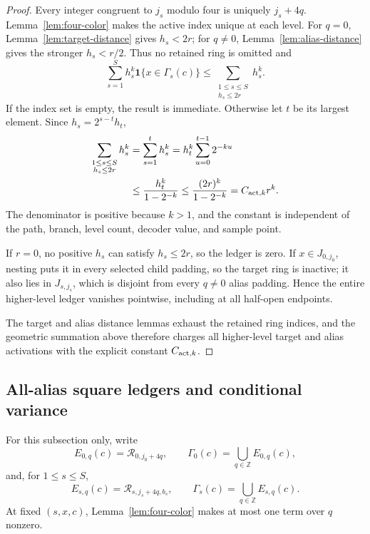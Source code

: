 \begin{proof}
Every integer congruent to $j_s$ modulo four is uniquely $j_s+4q$.
Lemma~\ref{lem:four-color} makes the active index unique at each level.  For
$q=0$, Lemma~\ref{lem:target-distance} gives $h_s<2r$; for $q\neq0$,
Lemma~\ref{lem:alias-distance} gives the stronger $h_s<r/2$.  Thus no
retained ring is omitted and
\[
 \sum_{s=1}^S h_s^k\mathbf1\{x\in\Gamma_s(c)\}
 \leq\sum_{\substack{1\leq s\leq S\\h_s\leq2r}}h_s^k.
\]
If the index set is empty, the result is immediate.  Otherwise let $t$ be
its largest element.  Since $h_s=2^{s-t}h_t$,
\[
\begin{aligned}
 \sum_{\substack{1\leq s\leq S\\h_s\leq2r}}h_s^k
 &=\sum_{s=1}^t h_s^k
 =h_t^k\sum_{u=0}^{t-1}2^{-ku}\\
 &\leq\frac{h_t^k}{1-2^{-k}}
 \leq\frac{(2r)^k}{1-2^{-k}}
 =C_{{\rm act},k}r^k.
\end{aligned}
\]
The denominator is positive because $k>1$, and the constant is independent
of the path, branch, level count, decoder value, and sample point.

If $r=0$, no positive $h_s$ can satisfy $h_s\leq2r$, so the ledger is
zero.  If $x\in J_{0,j_0}$, nesting puts it in every selected child padding,
so the target ring is inactive; it also lies in $J_{s,j_s}$, which is
disjoint from every $q\neq0$ alias padding.  Hence the entire higher-level
ledger vanishes pointwise, including at all half-open endpoints.

The target and alias distance lemmas exhaust the retained ring indices, and
the geometric summation above therefore charges all higher-level target and
alias activations with the explicit constant $C_{{\rm act},k}$.
\end{proof}

\subsection{All-alias square ledgers and conditional variance}

For this subsection only, write
\[
 E_{0,q}(c)=\mathcal R_{0,j_0+4q},\qquad
 \Gamma_0(c)=\bigcup_{q\in\mathbb Z}E_{0,q}(c),
\]
and, for $1\leq s\leq S$,
\[
 E_{s,q}(c)=\mathcal R_{s,j_s+4q,b_s},\qquad
 \Gamma_s(c)=\bigcup_{q\in\mathbb Z}E_{s,q}(c).
\]
At fixed $(s,x,c)$, Lemma~\ref{lem:four-color} makes at most one term over
$q$ nonzero.

